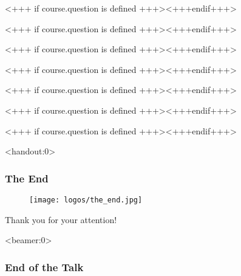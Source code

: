\documentclass[english,xcolor=pdftex,dvipsnames,aspectratio=<+++ if course.aspectratio is defined +++><++course.aspectratio++><+++else+++>43<+++endif+++>]{beamer}
\begin{document}

<+++ if course.question is defined +++><+++endif+++>

% 


<+++ if course.question is defined +++><+++endif+++>


<+++ if course.question is defined +++><+++endif+++>


<+++ if course.question is defined +++><+++endif+++>


      

<+++ if course.question is defined +++><+++endif+++>


<+++ if course.question is defined +++><+++endif+++>


<+++ if course.question is defined +++><+++endif+++> 

\begin{frame}<handout:0> 
	\frametitle{The End}
	\begin{center}
		\begin{figure}
			\centering
			
			\texttt{[image: logos/the\_end.jpg]}
		\end{figure}
		Thank you for your attention!
	\end{center}
\end{frame}

\begin{frame}<beamer:0> 
	\frametitle{End of the Talk}

\end{frame}
\end{document}
